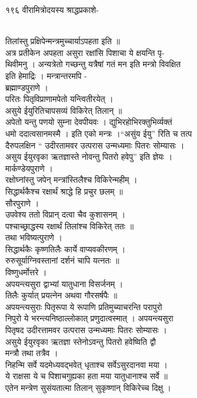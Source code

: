 \documentclass[11pt, openany]{book}
\begin{document}
{{{{{१९६ वीरामित्रोदयस्य श्राद्धप्रकाशे-}{\\
तिलांस्तु प्रक्षिपेन्मन्त्रमुच्चार्याऽपहता इति ॥\\
अत्र प्रतीकेन अपहता असुरा रक्षांसि पिशाचा ये क्षयन्ति पृ-\\
थिवीमनु । अन्यत्रेतो गच्छन्तु यत्रैषां गतं मन इति मन्त्रो विवक्षित\\
इति हेमाद्रिः । मन्त्रान्तरमपि -\\
ब्रह्माण्डपुराणे ।\\
परितः पितृविप्राणामपेतो यन्त्वितीरयेत् ।\\
असुये ईयुरितिचापसव्यं विकिरेत् तिलान् ॥\\
अपेतो यन्तु पणयो सुम्ना देवपीयवः । द्युभिरहोभिरक्तुभिर्व्यक्तं\\
धमो ददात्वसानमस्मै । इति एको मन्त्रः ।``असुंय ईयु'' रिति च तत्प\\
दैरुपलक्षिन `` उदीरतामवर उत्परास उन्मध्यमाः पितरः सोम्यासः ।\\
असुय ईयुरवृका ऋतज्ञास्ते नोवन्तु पितरो हवेपु'' इति ज्ञेयः ।\\
मार्कण्डेयपुराणे ।\\
रक्षोघ्नांस्तु जपेन् मन्त्रांस्तिलैश्च विकिरेन्महीम् ।\\
सिद्धार्थकैश्च रक्षार्थं श्राद्धे हि प्रचुर छलम् ॥\\
सौरपुराणे ।\\
उपवेश्य ततो विप्रान् दत्वा चैव कुशासनम् ।\\
पश्चाच्छ्राद्धस्य रक्षार्थं तिलांश्च विकिरेत् ततः ॥\\
तथा भविष्यत्पुराणे ।\\
सिद्धार्थकैः कृष्णतिलैः कार्ये वाप्यवकीरणम् ।\\
रुरुसूर्याग्निवस्तानां दर्शनं चापि यत्नतः ॥\\
विष्णुधर्मोत्तरे ।\\
अपयन्त्यसुरा द्वाभ्यां यातुधाना विसर्जनम् ।\\
तिलैः कुर्यात् प्रयत्नेन अथवा गौरसर्षपैः ॥\\
अपयन्त्यसुराः पितृरूपा ये रूपाणि प्रतिमुच्याचरन्ति परापुरो\\
निपुरो ये भरन्त्यनिष्ठाल्लोकात् प्रणुदात्वस्मात् । अपयन्त्यसुरा\\
पितृषद उदीरत्तामवर उत्परास उन्मध्यमाः पितरः सोम्यासः ।\\
असुये ईयुरवृका ऋतज्ञा स्तेनोऽवन्तु पितरो हवेष्विति द्वौ\\
मन्त्रौ तथा तत्रैव ।\\
निहन्मि सर्वे यदमेध्यवद्भवेत् धृताश्च सर्वेऽसुरदानवा मया ।\\
ये राक्षसा ये च पिशाचगुह्यका हता मया यातुधानाश्च सर्वे ॥\\
एतेन मन्त्रेण सुसंयतात्मा तिलान् सुकृष्णान् विकिरेच्च दिक्षु ।

}}}}}
\end{document}
